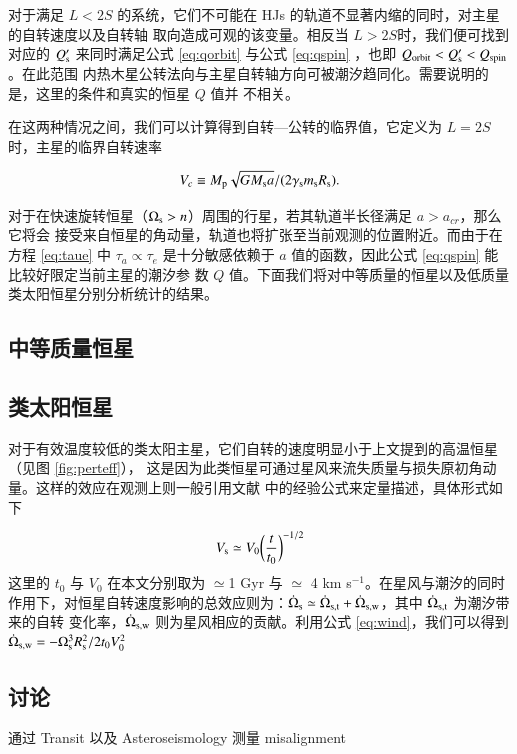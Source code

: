 对于满足 $L< 2S$ 的系统，它们不可能在 HJs 的轨道不显著内缩的同时，对主星的自转速度以及自转轴
取向造成可观的该变量。相反当 $L>2S$时，我们便可找到对应的 $Q_\mathrm{s}^\prime $ 来同时满足公式 
\ref{eq:qorbit} 与公式 \ref{eq:qspin} ，也即 $Q_{\rm orbit} < Q_\mathrm{s}^\prime < Q_{\rm spin}$。在此范围
内热木星公转法向与主星自转轴方向可被潮汐趋同化。需要说明的是，这里的条件和真实的恒星 $Q$ 值并
不相关。

在这两种情况之间，我们可以计算得到自转---公转的临界值，它定义为 $L=2S $时，主星的临界自转速率

\begin{equation} \label{eq:vc}
V_c \equiv {M_\mathrm{p} {\sqrt{G M_\mathrm{s} a}} /( 2 \gamma_\mathrm{s} m_\mathrm{s}R_\mathrm{s}}).
\end{equation} %

对于在快速旋转恒星（$\Omega_\mathrm{s} > n$）周围的行星，若其轨道半长径满足 $a > a_{cr}$，那么它将会
接受来自恒星的角动量，轨道也将扩张至当前观测的位置附近。而由于在方程 \ref{eq:taue} 中 $\tau_a 
\propto \tau_e$ 是十分敏感依赖于 $a$ 值的函数，因此公式 \ref{eq:qspin} 能比较好限定当前主星的潮汐参
数 $Q$ 值。下面我们将对中等质量的恒星以及低质量类太阳恒星分别分析统计的结果。

\subsection{中等质量恒星} \label{sec:hotstar}





\subsection{类太阳恒星} \label{sec:coolstar}

对于有效温度较低的类太阳主星，它们自转的速度明显小于上文提到的高温恒星（见图 \ref{fig:perteff}），
这是因为此类恒星可通过星风来流失质量与损失原初角动量。这样的效应在观测上则一般引用文献
 中的经验公式来定量描述，具体形式如下

\begin{equation} \label{eq:wind}
V_\mathrm{s} \simeq  V_0 \bigg( \frac{t}{t_0} \bigg)^{-1/2}
\end{equation}
这里的 $t_0$ 与 $V_0$ 在本文分别取为 $\simeq$1 Gyr 与 $\simeq$ 4 km s$^{-1}$。在星风与潮汐的同时
作用下\cite{DobbsDixon2004,Dawson2014}，对恒星自转速度影响的总效应则为：$\dot{\Omega}_\mathrm{s} 
\simeq \dot{\Omega}_\mathrm{s, t} + \dot{\Omega}_\mathrm{s, w}$，其中 $\dot{\Omega}_\mathrm{s, t}$ 为潮汐带来的自转
变化率，$\dot{\Omega}_\mathrm{s, w}$ 则为星风相应的贡献。利用公式 \ref{eq:wind}，我们可以得到 
$\dot{\Omega}_\mathrm{s, w} = -\Omega_\mathrm{s}^3 R_\mathrm{s}^2/2 t_0 V_0^2$

\subsection{讨论}


通过 Transit 以及 Asteroseismology 测量 misalignment 



